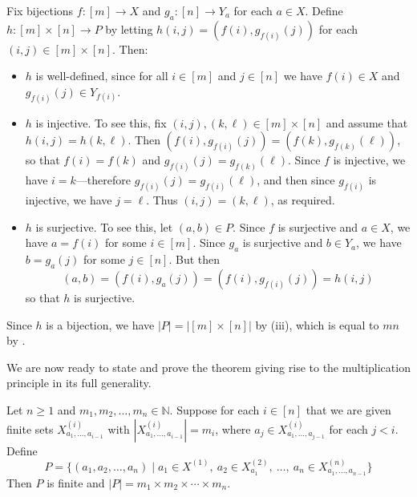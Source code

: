 \begin{cproof}
Fix bijections $f : [m] \to X$ and $g_a : [n] \to Y_a$ for each $a \in X$. Define $h : [m] \times [n] \to P$ by letting $h(i,j) = (f(i), g_{f(i)}(j))$ for each $(i,j) \in [m] \times [n]$. Then:
\begin{itemize}
\item $h$ is well-defined, since for all $i \in [m]$ and $j \in [n]$ we have $f(i) \in X$ and $g_{f(i)}(j) \in Y_{f(i)}$.
\item $h$ is injective. To see this, fix $(i,j), (k,\ell) \in [m] \times [n]$ and assume that $h(i,j) = h(k,\ell)$. Then $(f(i),g_{f(i)}(j)) = (f(k),g_{f(k)}(\ell))$, so that $f(i)=f(k)$ and $g_{f(i)}(j) = g_{f(k)}(\ell)$. Since $f$ is injective, we have $i=k$---therefore $g_{f(i)}(j) = g_{f(i)}(\ell)$, and then since $g_{f(i)}$ is injective, we have $j=\ell$. Thus $(i,j) = (k,\ell)$, as required.
\item $h$ is surjective. To see this, let $(a,b) \in P$. Since $f$ is surjective and $a \in X$, we have $a=f(i)$ for some $i \in [m]$. Since $g_a$ is surjective and $b \in Y_a$, we have $b=g_a(j)$ for some $j \in [n]$. But then
\[ (a,b) = (f(i), g_a(j)) = (f(i), g_{f(i)}(j)) = h(i,j) \]
so that $h$ is surjective.
\end{itemize}

Since $h$ is a bijection, we have $|P| = |[m] \times [n]|$ by (iii), which is equal to $mn$ by .
\end{cproof}

We are now ready to state and prove the theorem giving rise to the multiplication principle in its full generality.

\begin{theorem}
\label{thmMultPrinciple}
Let $n \ge 1$ and $m_1,m_2,\dots,m_n \in \mathbb{N}$. Suppose for each $i \in [n]$ that we are given finite sets $X^{(i)}_{a_1,\dots,a_{i-1}}$ with $|X^{(i)}_{a_1,\dots,a_{i-1}}| = m_i$, where $a_j \in X^{(i)}_{a_1,\dots,a_{j-1}}$ for each $j<i$. Define
\[ P = \{ (a_1,a_2,\dots,a_n) \mid a_1 \in X^{(1)}, ~ a_2 \in X^{(2)}_{a_1}, ~ \dots, ~ a_n \in X^{(n)}_{a_1,\dots,a_{n-1}} \} \]
Then $P$ is finite and $|P| = m_1 \times m_2 \times \cdots \times m_n$.
\end{theorem}

